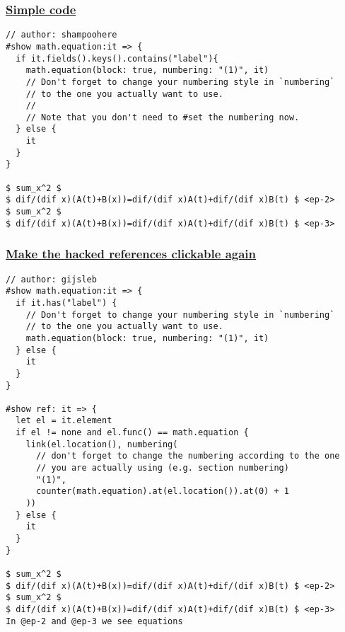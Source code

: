 \subsubsection{\texorpdfstring{\hyperref[simple-code]{Simple
code}}{Simple code}}\label{simple-code}

\begin{verbatim}
// author: shampoohere
#show math.equation:it => {
  if it.fields().keys().contains("label"){
    math.equation(block: true, numbering: "(1)", it)
    // Don't forget to change your numbering style in `numbering`
    // to the one you actually want to use.
    //
    // Note that you don't need to #set the numbering now.
  } else {
    it
  }
}

$ sum_x^2 $
$ dif/(dif x)(A(t)+B(x))=dif/(dif x)A(t)+dif/(dif x)B(t) $ <ep-2>
$ sum_x^2 $
$ dif/(dif x)(A(t)+B(x))=dif/(dif x)A(t)+dif/(dif x)B(t) $ <ep-3>
\end{verbatim}

\pandocbounded{}

\subsubsection{\texorpdfstring{\hyperref[make-the-hacked-references-clickable-again]{Make
the hacked references clickable
again}}{Make the hacked references clickable again}}\label{make-the-hacked-references-clickable-again}

\begin{verbatim}
// author: gijsleb
#show math.equation:it => {
  if it.has("label") {
    // Don't forget to change your numbering style in `numbering`
    // to the one you actually want to use.
    math.equation(block: true, numbering: "(1)", it)
  } else {
    it
  }
}

#show ref: it => {
  let el = it.element
  if el != none and el.func() == math.equation {
    link(el.location(), numbering(
      // don't forget to change the numbering according to the one
      // you are actually using (e.g. section numbering)
      "(1)",
      counter(math.equation).at(el.location()).at(0) + 1
    ))
  } else {
    it
  }
}

$ sum_x^2 $
$ dif/(dif x)(A(t)+B(x))=dif/(dif x)A(t)+dif/(dif x)B(t) $ <ep-2>
$ sum_x^2 $
$ dif/(dif x)(A(t)+B(x))=dif/(dif x)A(t)+dif/(dif x)B(t) $ <ep-3>
In @ep-2 and @ep-3 we see equations
\end{verbatim}

\pandocbounded{}
